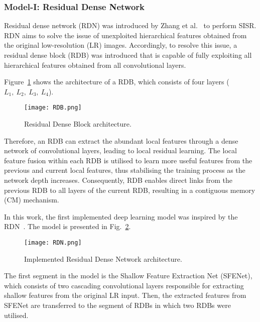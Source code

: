 \subsubsection{Model-I: Residual Dense Network}

Residual dense network (RDN) was introduced by Zhang et al.~\cite{Zhang2018} to perform SISR.
RDN aims to solve the issue of unexploited hierarchical features obtained from the original low-resolution (LR) images.
Accordingly, to resolve this issue, a residual dense block (RDB) was introduced that is capable of fully exploiting all hierarchical features obtained from all convolutional layers.

Figure~\ref{fig:RDB} shows the architecture of a RDB, which consists of four layers (\(L_1,\ L_2,\ L_3,\ L_4\)).
\begin{figure} [h!]
	\begin{center}
		\texttt{[image: RDB.png]}
	\end{center}
	\caption{Residual Dense Block architecture.} 
	\label{fig:RDB}
\end{figure}
Therefore, an RDB can extract the abundant local features through a dense network of convolutional layers, leading to local residual learning.
The local feature fusion within each RDB is utilised to learn more useful features from the previous and current local features, thus stabilising the training process as the network depth increases.
Consequently, RDB enables direct links from the previous RDB to all layers of the current RDB, resulting in a contiguous memory (CM) mechanism.

In this work, the first implemented deep learning model was inspired by the RDN~\cite{Zhang2018}. 
The model is presented in Fig.~\ref{fig:RDN}.
\begin{figure} [h!]
	\begin{center}
		\texttt{[image: RDN.png]}
	\end{center}
	\caption{Implemented Residual Dense Network architecture.} 
	\label{fig:RDN}
\end{figure}
The first segment in the model is the Shallow Feature Extraction Net (SFENet), which consists of two cascading convolutional layers responsible for extracting shallow features from the original LR input.
Then, the extracted features from SFENet are transferred to the segment of RDBs in which two RDBs were utilised.

